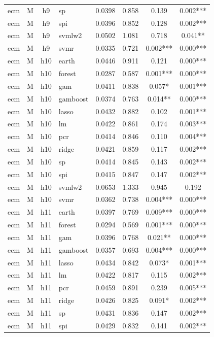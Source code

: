 \begin{ThreePartTable}
\begin{longtable}[t]{llclcccc}
ecm & M & h9 & sp & 0.0398 & 0.858 & 0.139 & 0.002***\\
ecm & M & h9 & spi & 0.0396 & 0.852 & 0.128 & 0.002***\\
ecm & M & h9 & svmlw2 & 0.0502 & 1.081 & 0.718 & 0.041**\\
ecm & M & h9 & svmr & 0.0335 & 0.721 & 0.002*** & 0.000***\\
\addlinespace
ecm & M & h10 & earth & 0.0446 & 0.911 & 0.121 & 0.000***\\
ecm & M & h10 & forest & 0.0287 & 0.587 & 0.001*** & 0.000***\\
ecm & M & h10 & gam & 0.0411 & 0.838 & 0.057* & 0.001***\\
ecm & M & h10 & gamboost & 0.0374 & 0.763 & 0.014** & 0.000***\\
ecm & M & h10 & lasso & 0.0432 & 0.882 & 0.102 & 0.001***\\
ecm & M & h10 & lm & 0.0422 & 0.861 & 0.174 & 0.003***\\
ecm & M & h10 & pcr & 0.0414 & 0.846 & 0.110 & 0.004***\\
ecm & M & h10 & ridge & 0.0421 & 0.859 & 0.117 & 0.002***\\
ecm & M & h10 & sp & 0.0414 & 0.845 & 0.143 & 0.002***\\
ecm & M & h10 & spi & 0.0415 & 0.847 & 0.147 & 0.002***\\
ecm & M & h10 & svmlw2 & 0.0653 & 1.333 & 0.945 & 0.192\\
ecm & M & h10 & svmr & 0.0362 & 0.738 & 0.004*** & 0.000***\\
\addlinespace
ecm & M & h11 & earth & 0.0397 & 0.769 & 0.009*** & 0.000***\\
ecm & M & h11 & forest & 0.0294 & 0.569 & 0.001*** & 0.000***\\
ecm & M & h11 & gam & 0.0396 & 0.768 & 0.021** & 0.000***\\
ecm & M & h11 & gamboost & 0.0357 & 0.693 & 0.004*** & 0.000***\\
ecm & M & h11 & lasso & 0.0434 & 0.842 & 0.073* & 0.001***\\
ecm & M & h11 & lm & 0.0422 & 0.817 & 0.115 & 0.002***\\
ecm & M & h11 & pcr & 0.0459 & 0.891 & 0.239 & 0.005***\\
ecm & M & h11 & ridge & 0.0426 & 0.825 & 0.091* & 0.002***\\
ecm & M & h11 & sp & 0.0431 & 0.836 & 0.147 & 0.002***\\
ecm & M & h11 & spi & 0.0429 & 0.832 & 0.141 & 0.002***\\

\end{longtable}
\end{ThreePartTable}
